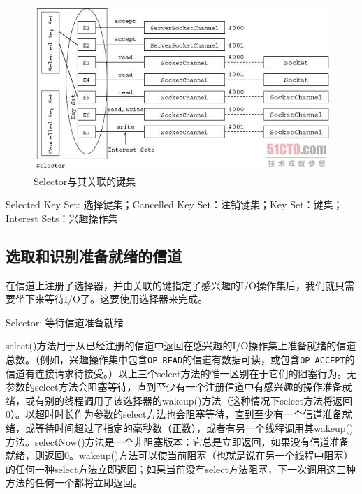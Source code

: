 		\clearpage

		\begin{figure}[htbp]%
			\centering
			\includegraphics[scale=.6]{img/05.01.jpg}
			\caption{Selector与其关联的键集}
			\label{fig:selector.and.its.key.set}
		\end{figure}

		Selected Key Set: 选择键集；Cancelled Key Set：注销键集；Key Set：键集；Interest Sets：兴趣操作集 

	\subsection{选取和识别准备就绪的信道}

		在信道上注册了选择器，并由关联的键指定了感兴趣的I/O操作集后，我们就只需要坐下来等待I/O了。这要使用选择器来完成。

		Selector: 等待信道准备就绪

		

	select()方法用于从已经注册的信道中返回在感兴趣的I/O操作集上准备就绪的信道总数。（例如，兴趣操作集中包含\verb|OP_READ|的信道有数据可读，或包含\verb|OP_ACCEPT|的信道有连接请求待接受。）以上三个select方法的惟一区别在于它们的阻塞行为。无参数的select方法会阻塞等待，直到至少有一个注册信道中有感兴趣的操作准备就绪，或有别的线程调用了该选择器的wakeup()方法（这种情况下select方法将返回0）。以超时时长作为参数的select方法也会阻塞等待，直到至少有一个信道准备就绪，或等待时间超过了指定的毫秒数（正数），或者有另一个线程调用其wakeup()方法。selectNow()方法是一个非阻塞版本：它总是立即返回，如果没有信道准备就绪，则返回0。wakeup()方法可以使当前阻塞（也就是说在另一个线程中阻塞）的任何一种select方法立即返回；如果当前没有select方法阻塞，下一次调用这三种方法的任何一个都将立即返回。


